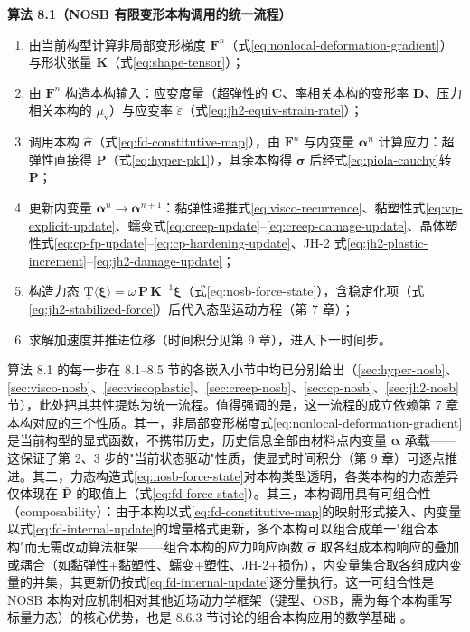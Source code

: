 \textbf{算法 8.1（NOSB 有限变形本构调用的统一流程）}
\begin{enumerate}
  \item 由当前构型计算非局部变形梯度 $\mathbf{F}^{n}$（式\eqref{eq:nonlocal-deformation-gradient}）与形状张量 $\mathbf{K}$（式\eqref{eq:shape-tensor}）；
  \item 由 $\mathbf{F}^{n}$ 构造本构输入：应变度量（超弹性的 $\mathbf{C}$、率相关本构的变形率 $\mathbf{D}$、压力相关本构的 $\mu_{\mathrm{v}}$）与应变率 $\dot{\varepsilon}$（式\eqref{eq:jh2-equiv-strain-rate}）；
  \item 调用本构 $\hat{\boldsymbol{\sigma}}$（式\eqref{eq:fd-constitutive-map}），由 $\mathbf{F}^{n}$ 与内变量 $\boldsymbol{\alpha}^{n}$ 计算应力：超弹性直接得 $\mathbf{P}$（式\eqref{eq:hyper-pk1}），其余本构得 $\boldsymbol{\sigma}$ 后经式\eqref{eq:piola-cauchy}转 $\mathbf{P}$；
  \item 更新内变量 $\boldsymbol{\alpha}^{n}\to\boldsymbol{\alpha}^{n+1}$：黏弹性递推式\eqref{eq:visco-recurrence}、黏塑性式\eqref{eq:vp-explicit-update}、蠕变式\eqref{eq:creep-update}--\eqref{eq:creep-damage-update}、晶体塑性式\eqref{eq:cp-fp-update}--\eqref{eq:cp-hardening-update}、JH-2 式\eqref{eq:jh2-plastic-increment}--\eqref{eq:jh2-damage-update}；
  \item 构造力态 $\underline{\mathbf{T}}\langle\boldsymbol{\xi}\rangle=\omega\,\mathbf{P}\,\mathbf{K}^{-1}\boldsymbol{\xi}$（式\eqref{eq:nosb-force-state}），含稳定化项（式\eqref{eq:jh2-stabilized-force}）后代入态型运动方程（第 7 章）；
  \item 求解加速度并推进位移（时间积分见第 9 章），进入下一时间步。
\end{enumerate}

算法 8.1 的每一步在 8.1--8.5 节的各嵌入小节中均已分别给出（\ref{sec:hyper-nosb}、\ref{sec:visco-nosb}、\ref{sec:viscoplastic}、\ref{sec:creep-nosb}、\ref{sec:cp-nosb}、\ref{sec:jh2-nosb}节），此处把其共性提炼为统一流程。值得强调的是，这一流程的成立依赖第 7 章本构对应的三个性质。其一，非局部变形梯度式\eqref{eq:nonlocal-deformation-gradient}是当前构型的显式函数，不携带历史，历史信息全部由材料点内变量 $\boldsymbol{\alpha}$ 承载——这保证了第 2、3 步的"当前状态驱动"性质，使显式时间积分（第 9 章）可逐点推进。其二，力态构造式\eqref{eq:nosb-force-state}对本构类型透明，各类本构的力态差异仅体现在 $\bar{\mathbf{P}}$ 的取值上（式\eqref{eq:fd-force-state}）。其三，本构调用具有可组合性（composability）：由于本构以式\eqref{eq:fd-constitutive-map}的映射形式接入、内变量以式\eqref{eq:fd-internal-update}的增量格式更新，多个本构可以组合成单一"组合本构"而无需改动算法框架——组合本构的应力响应函数 $\hat{\boldsymbol{\sigma}}$ 取各组成本构响应的叠加或耦合（如黏弹性+黏塑性、蠕变+塑性、JH-2+损伤），内变量集合取各组成内变量的并集，其更新仍按式\eqref{eq:fd-internal-update}逐分量执行。这一可组合性是 NOSB 本构对应机制相对其他近场动力学框架（键型、OSB，需为每个本构重写标量力态）的核心优势，也是 8.6.3 节讨论的组合本构应用的数学基础 \cite{Silling2007,Javili2019,Hashim2020}。

